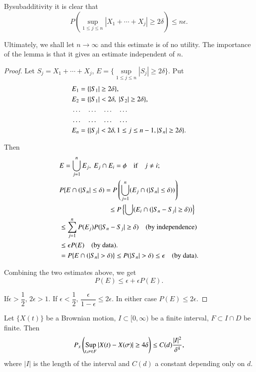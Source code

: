 \begin{remark*}
By\pageoriginale subadditivity it is clear that
$$
P\left(\sup\limits_{1\leq j\leq n}|X_{1}+\cdots+X_{j}|\geq
2\delta\right)\leq n\epsilon.
$$

Ultimately, we shall let $n\to \infty$ and this estimate is of no
utility. The importance of the lemma is that it gives an estimate
independent of $n$.
\end{remark*}


\begin{proof}
Let $S_{j}=X_{1}+\cdots+X_{j}$, $E=\{\sup\limits_{1\leq j\leq
  n}|S_{j}|\geq 2\delta\}$. Put
\begin{align*}
& E_{1}=\{|S_{1}|\geq 2\delta\},\\
& E_{2}=\{|S_{1}|<2\delta,\ |S_{2}|\geq 2\delta\},\\
& \ldots\quad \ldots\quad \ldots\quad\ldots\\
& \ldots\quad \ldots\quad \ldots\quad\ldots\\
& E_{n}=\{|S_{j}|<2\delta, 1\leq j\leq n-1, |S_{n}|\geq 2\delta\}.
\end{align*}

Then
\begin{align*}
& E=\bigcup^{n}_{j=1}E_{j},\ E_{j}\cap E_{i}=\phi\quad\text{if}\quad
  j\neq i;\\
& P\{E\cap (|S_{n}|\leq \delta)=P\left(\bigcup^{n}_{j=1}(E_{j}\cap
  (|S_{n}|\leq \delta))\right)\\
&\hspace{2.5cm} \leq P\left\{\bigcup (E_{i}\cap (|S_{n}-S_{j}|\geq
  \delta))\right\}\\
& \leq \sum^{n}_{j=1}P(E_{j})P(|S_{n}-S_{j}|\geq \delta)\quad\text{(by
    independence)}\\
&\leq \epsilon P(E)\quad\text{(by data).}\\
&= P\{E\cap (|S_{n}|>\delta)\}\leq P(|S_{n}|>\delta)\leq
  \epsilon\quad\text{(by data).}
\end{align*}

Combining the two estimates above, we get
$$
P(E)\leq \epsilon+\epsilon P(E).
$$

If\pageoriginale $\epsilon>\dfrac{1}{2}$, $2\epsilon>1$. If
$\epsilon<\dfrac{1}{2}$, $\dfrac{\epsilon}{1-\epsilon}\leq
2\epsilon$. In either case $P(E)\leq 2\epsilon$.
\end{proof}

\begin{lemma*}
Let $\{X(t)\}$ be a Brownian motion, $I\subset [0,\infty)$ be a finite
  interval, $F\subset I\cap D$ be finite. Then
$$
P_{x}\left(\operatorname*{Sup}\limits_{t,\sigma\in F}|X(t)-X(\sigma)|\geq
4\delta\right)\leq C(d)\dfrac{|I|^{2}}{\delta^{4}},
$$
where $|I|$ is the length of the interval and $C(d)$ a constant
depending only on $d$.
\end{lemma*}

